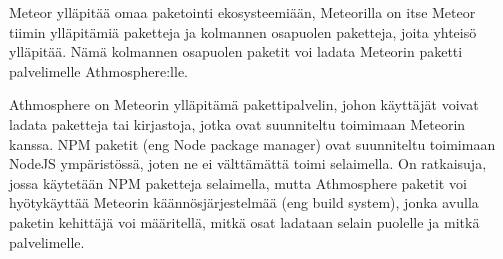 

Meteor ylläpitää omaa paketointi ekosysteemiään, 
Meteorilla on itse Meteor tiimin ylläpitämiä paketteja ja kolmannen osapuolen paketteja,
joita yhteisö ylläpitää. Nämä kolmannen osapuolen paketit voi ladata Meteorin paketti palvelimelle Athmosphere:lle.
\medskip


Athmosphere on Meteorin ylläpitämä pakettipalvelin, johon käyttäjät voivat ladata paketteja tai kirjastoja,
jotka ovat suunniteltu toimimaan Meteorin kanssa.
NPM paketit (eng Node package manager) ovat suunniteltu toimimaan NodeJS ympäristössä, joten ne ei välttämättä toimi selaimella.
On ratkaisuja, jossa käytetään NPM paketteja selaimella, mutta
Athmosphere paketit voi hyötykäyttää Meteorin käännösjärjestelmää (eng build system),
jonka avulla paketin kehittäjä voi määritellä, mitkä osat ladataan selain puolelle ja mitkä palvelimelle.

